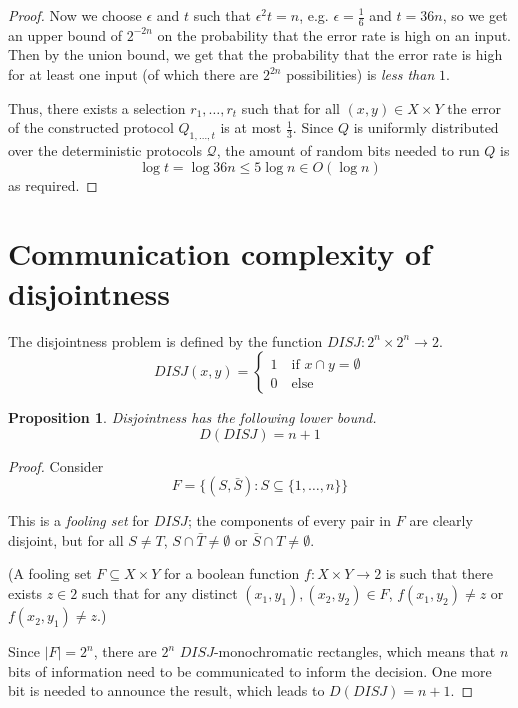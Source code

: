 \documentclass[letterpaper,11pt]{article}
\newtheorem{prop}{Proposition}
\begin{document}
\begin{proof}
    Now we choose $\epsilon$ and $t$ such that $\epsilon^2 t = n$, e.g.
    $\epsilon = \frac{1}{6}$ and $t = 36n$, so we get an upper bound of
    $2^{-2n}$ on the probability that the error rate is high on an input. Then
    by the union bound, we get that the probability that the error rate is high
    for at least one input (of which there are $2^{2n}$ possibilities) is
    \emph{less than} $1$.

    Thus, there exists a selection $r_1, \ldots, r_t$ such that for all $(x, y)
    \in X \times Y$ the error of the constructed protocol $Q_{1,\ldots,t}$ is
    at most $\frac{1}{3}$. Since $Q$ is uniformly distributed over the
    deterministic protocols $\mathcal{Q}$, the amount of random bits needed to
    run $Q$ is
    \begin{equation*}
        \log t = \log {36n} \leq 5 \log n \in O(\log n)
    \end{equation*}
    as required.
\end{proof}

\section{Communication complexity of disjointness}

The disjointness problem is defined by the function
$DISJ : 2^n \times 2^n \to 2$.
\begin{equation*}
    DISJ(x, y) = \begin{cases}
        1 \quad \text{if } x \cap y = \emptyset \\
        0 \quad \text{else}
    \end{cases}
\end{equation*}

\begin{prop}
    Disjointness has the following lower bound.
    \begin{equation*}
        D(DISJ) = n + 1
    \end{equation*}
\end{prop}

\begin{proof}
    Consider
    \begin{equation*}
        F = \{(S, \bar S) : S \subseteq \{1, \ldots, n\}\}
    \end{equation*}

    This is a \emph{fooling set} for $DISJ$; the components of every pair in
    $F$ are clearly disjoint, but for all $S \neq T$, $S \cap \bar T \neq
    \emptyset$ or $\bar S \cap T \neq \emptyset$.

    (A fooling set $F \subseteq X \times Y$ for a boolean function
    $f : X \times Y \to 2$ is such that there exists $z \in 2$ such that for
    any distinct $(x_1, y_1), (x_2, y_2) \in F$, $f(x_1, y_2) \neq z$ or
    $f(x_2, y_1) \neq z$.)

    Since $|F| = 2^n$, there are $2^n$ $DISJ$-monochromatic rectangles, which
    means that $n$ bits of information need to be communicated to inform the
    decision. One more bit is needed to announce the result, which leads to
    $D(DISJ) = n+1$.
\end{proof}
\end{document}
